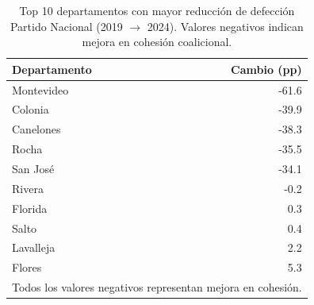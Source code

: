 \begin{table}[H]
\centering
\caption{Top 10 departamentos con mayor reducción de defección Partido Nacional (2019 $\to$ 2024). Valores negativos indican mejora en cohesión coalicional.}
\label{tab:dept_changes_pn_top10}
\begin{tabular}{lr}
\toprule
\textbf{Departamento} & \textbf{Cambio (pp)} \\
\midrule
Montevideo & -61.6 \\
Colonia & -39.9 \\
Canelones & -38.3 \\
Rocha & -35.5 \\
San José & -34.1 \\
Rivera & -0.2 \\
Florida & 0.3 \\
Salto & 0.4 \\
Lavalleja & 2.2 \\
Flores & 5.3 \\
\bottomrule
\multicolumn{2}{l}{\footnotesize Todos los valores negativos representan mejora en cohesión.} \\
\end{tabular}
\end{table}
